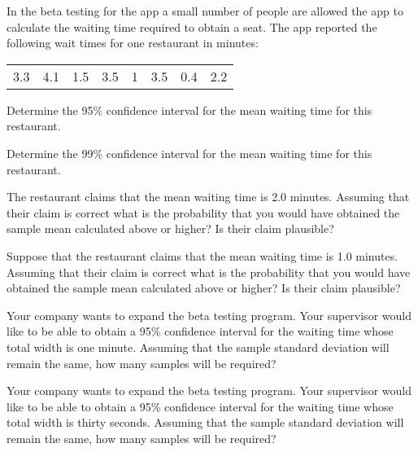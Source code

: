 \begin{problem}
\item In the beta testing for the app a small number of people are
  allowed the app to calculate the waiting time required to obtain a
  seat.  The app reported the following wait times for one restaurant in minutes: \\
  \begin{tabular}{rrrrrrrr}
    3.3 & 4.1 & 1.5 & 3.5 & 1 & 3.5 & 0.4 & 2.2
  \end{tabular}
    \begin{subproblem}
    \item Determine the 95\% confidence interval for the mean waiting time
      for this restaurant.

      \vfill

    \item Determine the 99\% confidence interval for the mean waiting time
      for this restaurant.

      \vfill

      \clearpage

    \item The restaurant claims that the mean waiting time is 2.0
      minutes. Assuming that their claim is correct what is the
      probability that you would have obtained the sample mean
      calculated above or higher? Is their claim plausible?

      \vfill

    \item Suppose that the restaurant claims that the mean waiting
      time is 1.0 minutes. Assuming that their claim is correct what
      is the probability that you would have obtained the sample mean
      calculated above or higher? Is their claim plausible?

      \vfill

      \clearpage

    \item Your company wants to expand the beta testing program. Your
      supervisor would like to be able to obtain a 95\% confidence
      interval for the waiting time whose total width is one
      minute. Assuming that the sample standard deviation will remain
      the same, how many samples will be required?

      \vfill

    \item Your company wants to expand the beta testing program. Your
      supervisor would like to be able to obtain a 95\% confidence
      interval for the waiting time whose total width is thirty
      seconds. Assuming that the sample standard deviation will remain
      the same, how many samples will be required?


\end{subproblem}
\end{problem}
